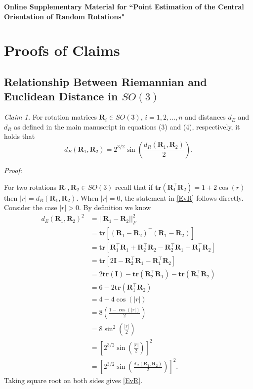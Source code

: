 \documentclass[12pt]{article}
\newcommand{\tr}{{\mathbf{tr}}}
\newcommand{\Rdist}{{d_R}}
\newcommand{\Edist}{{d_E}}
\begin{document}
\def\spacingset#1{\renewcommand{\baselinestretch}%
{#1}\small\normalsize} \spacingset{1}
\appendix
\spacingset{1.45} %
\begin{center}
\Large \textbf{Online Supplementary Material for ``Point Estimation of the Central Orientation of Random Rotations"}
\end{center}
\section{Proofs of Claims}
\subsection{Relationship Between Riemannian and Euclidean Distance in $SO(3)$}
\label{sec:appendix2}
\textit{Claim 1.} For rotation matrices $\bm R_i\in SO(3)$, $i=1,2,\ldots,n$ and distances $d_E$ and $d_R$ as defined in the main manuscript in equations (3) and (4), respectively,  it holds that 
\begin{equation}
\label{EvR}
\Edist(\bm R_1,\bm R_2)=2^{3/2}\sin\left(\frac{\Rdist(\bm{R}_1,\bm{R}_2)}{2}\right).
\end{equation}

\noindent \textit{Proof:} 

\noindent For two rotations $\bm{R}_1,\bm{R}_2\in SO(3)$ recall that if $\tr(\bm R_1^\top\bm R_2)=1+2\cos(r)$ then $|r|=\Rdist(\bm R_1,\bm R_2)$.  When $|r|=0$, the statement in \eqref{EvR} follows directly.  Consider the case $|r|>0$.  By definition we know
\begin{align*}
\Edist (\bm R_1,\bm R_2)^2
&=||\bm R_1-\bm R_2||_F^2\\
&=\tr\left[(\bm R_1-\bm R_2)^\top(\bm R_1-\bm R_2)\right]\\
&=\tr\left[\bm R_1^\top\bm R_1+\bm R_2^\top\bm R_2-\bm R_2^\top\bm R_1-\bm R_1^\top\bm R_2\right]\\
&=\tr\left[2\bm{I}-\bm R_2^\top\bm R_1-\bm R_1^\top\bm R_2\right]\\
&=2\tr(\bm{I})-\tr(\bm R_2^\top\bm R_1)-\tr(\bm R_1^\top\bm R_2)\\
&=6-2\tr(\bm R_1^\top\bm R_2)\\
&=4-4\cos(|r|)\\ 
&=8\left(\frac{1-\cos(|r|)}{2}\right)\\
&=8\sin^2\left(\frac{|r|}{2}\right)\\
&=\left[2^{3/2}\sin\left(\frac{|r|}{2}\right)\right]^2\\
&=\left[2^{3/2}\sin\left(\frac{\Rdist(\bm R_1,\bm R_2)}{2}\right)\right]^2.
\end{align*}
Taking square root on both sides gives \eqref{EvR}.
\end{document}
